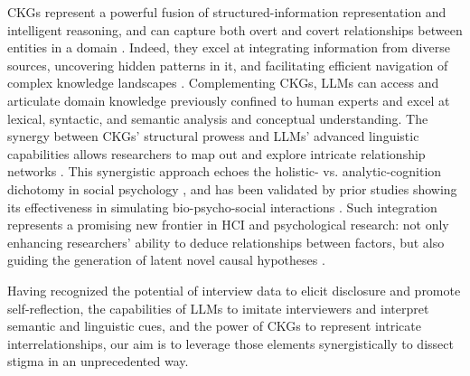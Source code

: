 CKGs represent a powerful fusion of structured-information representation and intelligent reasoning, and can capture both overt and covert relationships between entities in a domain \cite{kg_carta_2023}.
Indeed, they excel at integrating information from diverse sources, uncovering hidden patterns in it, and facilitating efficient navigation of complex knowledge landscapes \cite{ckg_uleman_2021, ckg_borsboom_2021}. 
Complementing CKGs, LLMs can access and articulate domain knowledge previously confined to human experts \cite{ckg_llm_kiciman_2024} and excel at lexical, syntactic, and semantic analysis and conceptual understanding.
The synergy between CKGs' structural prowess and LLMs' advanced linguistic capabilities \cite{ckg_llm_tong_2024} allows researchers to map out and explore intricate relationship networks \cite{kg_llm_pan_2024}. %
This synergistic approach echoes the holistic- vs. analytic-cognition dichotomy in social psychology \cite{human_psych_nisbett_2001}, and has been validated by prior studies showing its effectiveness in simulating bio-psycho-social interactions \cite{ckg_borsboom_2021, kg_psych_crielaard_2022}.
Such integration represents a promising new frontier in HCI and psychological research: not only enhancing researchers' ability to deduce relationships between factors, but also guiding the generation of latent novel causal hypotheses \cite{ckg_llm_tong_2024}. 


Having recognized the potential of interview data to elicit disclosure and promote self-reflection, the capabilities of LLMs to imitate interviewers and interpret semantic and linguistic cues, and the power of CKGs to represent intricate interrelationships, our aim is to leverage those elements synergistically to dissect stigma in an unprecedented way. 





